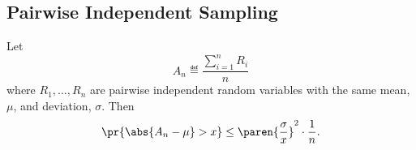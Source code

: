\documentclass[handout]{mcs}
\begin{document}
{\subsection*{Pairwise Independent Sampling}

\begin{theorem*}
Let
\[
A_n \eqdef \frac{\sum_{i=1}^n R_i}{n}
\]
where $R_1, \dots, R_n$ are pairwise independent random variables with the
same mean, $\mu$, and deviation, $\sigma$.  Then
\[ %
\pr{\abs{A_n - \mu} > x} \leq 
\paren{\frac{\sigma}{x}}^2 \cdot \frac{1}{n}.
\] %
\end{theorem*}
\iffalse

\begin{proof}
By linearity of expectation,
\[
\expect{A_n} = \frac{\expect{\sum_{i=1}^n R_i}}{n}
   = \frac{\sum_{i=1}^n \expect{R_i}}{n}
   = \frac{n\mu}{n} = \mu.
\]

Since the $R_i$'s are pairwise independent, their variances will also add,
so
\begin{align*}
\variance{A_n}  = & \paren{\frac{1}{n}}^2 \variance{\sum_{i=1}^n R_i}
                        & \text{(by~\eqref{a2v})}\\
 = & \paren{\frac{1}{n}}^2 \sum_{i=1}^n \variance{R_i}
                        & \text{(additivity)}\\
 = & \paren{\frac{1}{n}}^2 n\sigma^2\\
 = & \frac{\sigma^2}{n}.
\end{align*}

Now letting $R$ be $A_n$ in Chebyshev's Bound~\eqref{Chb}
yields~\eqref{Sndev}, as required.

\end{proof}\fi

}
\end{document}
